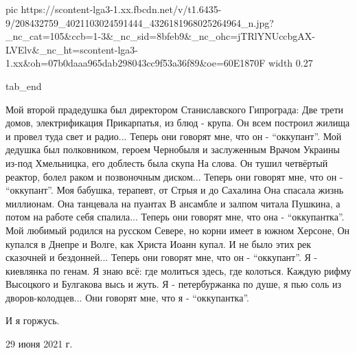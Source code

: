      pic https://scontent-lga3-1.xx.fbcdn.net/v/t1.6435-9/208432759_4021103024591444_4326181968025264964_n.jpg?_nc_cat=105&ccb=1-3&_nc_sid=8bfeb9&_nc_ohc=jTRlYNUccbgAX-LVElv&_nc_ht=scontent-lga3-1.xx&oh=07b0daaa965dab298043cc9f53a36f89&oe=60E1870F
     width 0.27

  tab_end
\fi

\obeycr
\noindent Мой второй прадедушка был директором Станиславского Гипрограда:
Две трети домов, электрификация Прикарпатья, из блюд - крупа.
Он всем построил жилища и провел туда свет и радио...
Теперь они говорят мне, что он - \enquote{оккупант}.
\smallskip
Мой дедушка был полковником, героем Чернобыля и заслуженным 
Врачом Украины из-под Хмельницка, его доблесть была скупа
На слова. Он тушил четвёртый реактор, болел раком и позвоночным диском...
Теперь они говорят мне, что он - \enquote{оккупант}.
\smallskip
Моя бабушка, терапевт, от Стрыя и до Сахалина
Она спасала жизнь миллионам. Она танцевала на пуантах
В ансамбле и залпом читала Пушкина, а потом на работе себя спалила...
Теперь они говорят мне, что она - \enquote{оккупантка}.
\smallskip
Мой любимый родился на русском Севере, но корни имеет в южном Херсоне,
Он купался в Днепре и Волге, как Христа Иоанн купал.
И не было этих рек сказочней и бездонней...
Теперь они говорят мне, что он - \enquote{оккупант}.
\smallskip
Я - киевлянка по генам. Я знаю всё: где молиться здесь, где колоться.
Каждую рифму Высоцкого и Булгакова высь и жуть. 
Я - петербуржанка по душе, я пью соль из дворов-колодцев...
Они говорят мне, что я - \enquote{оккупантка}.
\restorecr

\noindent
И я горжусь.

29 июня 2021 г.
